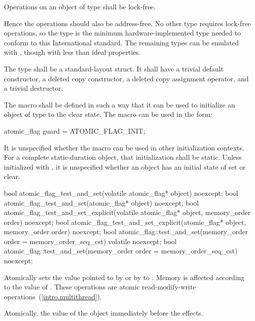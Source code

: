 \pnum
Operations on an object of type  shall be lock-free. \begin{note} Hence
the operations should also be address-free. No other type requires lock-free operations,
so the  type is the minimum hardware-implemented type needed to
conform to this International standard. The remaining types can be emulated with
, though with less than ideal properties. \end{note}

\pnum
The  type shall be a standard-layout struct.
It shall have a trivial default constructor, a deleted copy constructor, a deleted copy assignment operator, and a trivial destructor.

\pnum
The macro  shall be defined in such a way that it can be used to initialize an object of type  to the
clear state. The macro can be used in the form:
\begin{codeblock}
atomic_flag guard = ATOMIC_FLAG_INIT;
\end{codeblock}
It is unspecified whether the macro can be used in other initialization contexts.
For a complete static-duration object, that initialization shall be static.
Unless initialized with , it is unspecified whether an
 object has an initial state of set or clear.

%
%
%
\begin{itemdecl}
bool atomic_flag_test_and_set(volatile atomic_flag* object) noexcept;
bool atomic_flag_test_and_set(atomic_flag* object) noexcept;
bool atomic_flag_test_and_set_explicit(volatile atomic_flag* object, memory_order order) noexcept;
bool atomic_flag_test_and_set_explicit(atomic_flag* object, memory_order order) noexcept;
bool atomic_flag::test_and_set(memory_order order = memory_order_seq_cst) volatile noexcept;
bool atomic_flag::test_and_set(memory_order order = memory_order_seq_cst) noexcept;
\end{itemdecl}

\begin{itemdescr}
\pnum
\effects Atomically sets the value pointed to by  or by  to . Memory is affected according to the value of
. These operations are atomic read-modify-write operations~(\ref{intro.multithread}).

\pnum
\returns Atomically, the value of the object immediately before the effects.
\end{itemdescr}


